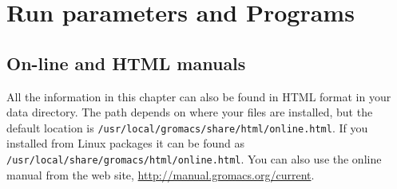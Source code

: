 %
%
%
%
%
%

\chapter{Run parameters and Programs}
\label{ch:programs}

\section{On-line and HTML manuals}
All the information in this chapter can also be found in HTML
format in your {\gromacs} data directory. The path depends on
where your files are installed, but the default location is
{\tt /usr/local/gromacs/share/html/online.html}.
If you installed from Linux packages it can be found as
{\tt /usr/local/share/gromacs/html/online.html}.
You can also use the online manual from the {\gromacs} web site,
\url{http://manual.gromacs.org/current}.

